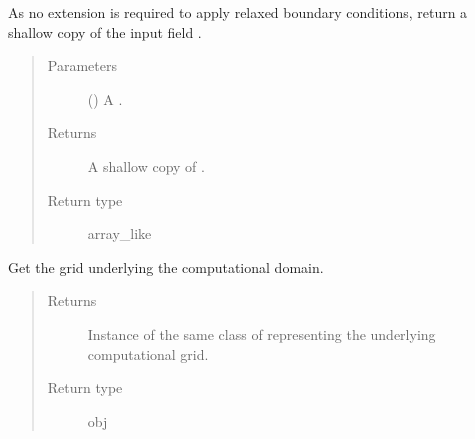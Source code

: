 \documentclass[letterpaper,10pt,english]{sphinxmanual}
\begin{document}
\begin{fulllineitems}

\begin{fulllineitems}
\label{\detokenize{api:tasmania.dycore.horizontal_boundary_relaxed.Relaxed.from_physical_to_computational_domain}}
As no extension is required to apply relaxed boundary conditions, return a shallow copy of the
input field .
\begin{quote}\begin{description}
\item[{Parameters}] \leavevmode
{} () \textendash{} A .

\item[{Returns}] \leavevmode
A shallow copy of .

\item[{Return type}] \leavevmode
array\_like

\end{description}\end{quote}

\end{fulllineitems}


\begin{fulllineitems}
\label{\detokenize{api:tasmania.dycore.horizontal_boundary_relaxed.Relaxed.get_computational_grid}}
Get the  grid underlying the computational domain.
\begin{quote}\begin{description}
\item[{Returns}] \leavevmode
Instance of the same class of 
representing the underlying computational grid.

\item[{Return type}] \leavevmode
obj

\end{description}\end{quote}


\end{fulllineitems}
\end{fulllineitems}
\end{document}
